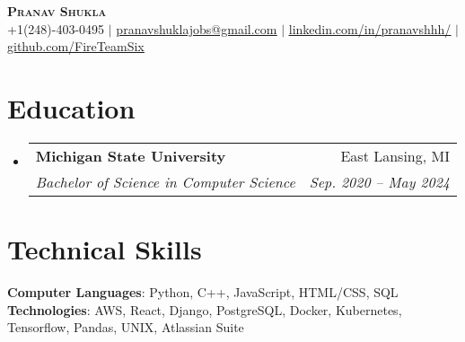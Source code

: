 \documentclass[letterpaper,11pt]{article}
\makeatletter
\newcommand{\resumeSubheading}[4]{
  \vspace{-2pt}\item
    \begin{tabular*}{0.97\textwidth}[t]{l@{\extracolsep{\fill}}r}
      \textbf{#1} & #2 \\
      \textit{\small#3} & \textit{\small #4} \\
    \end{tabular*}\vspace{-7pt}
}
\newcommand{\resumeSubHeadingListStart}{\begin{itemize}[leftmargin=0.15in, label={}]}
\newcommand{\resumeSubHeadingListEnd}{\end{itemize}}
\makeatother
\begin{document}

\begin{center}
    \textbf{\Huge \scshape Pranav Shukla} \\ \vspace{1pt}
    \small +1(248)-403-0495 $|$ \href{mailto:pranavshuklajobs@gmail.com}{\underline{pranavshuklajobs@gmail.com}} $|$ 
    \href{https://www.linkedin.com/in/pranavshhh/}{\underline{linkedin.com/in/pranavshhh/}} $|$
    \href{https://github.com/FireTeamSix}{\underline{github.com/FireTeamSix}}
\end{center}


\section{Education}
  \resumeSubHeadingListStart
    \resumeSubheading
      {Michigan State University}{East Lansing, MI}
      {Bachelor of Science in Computer Science}{Sep. 2020 -- May 2024}
  \resumeSubHeadingListEnd

\section{Technical Skills}
 \begin{itemize}[leftmargin=0.15in, label={}]
    \small{\item{
     \textbf{Computer Languages}{: Python, C++, JavaScript, HTML/CSS, SQL} \\
     \textbf{Technologies}{: AWS, React, Django, PostgreSQL, Docker, Kubernetes, Tensorflow, Pandas, UNIX, Atlassian Suite} \\
    }}
 \end{itemize}

\end{document}
